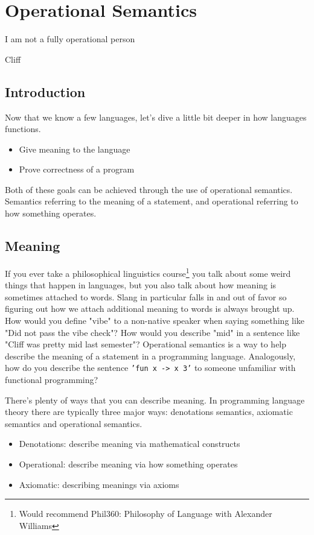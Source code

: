 \documentclass[main.tex]{subfiles}
\begin{document}
\chapter{Operational Semantics}
\epigraph{I am not a fully operational person}{Cliff}

\section{Introduction}
Now that we know a few languages, let's dive a little bit deeper in how languages functions. 
\begin{itemize}
    \item Give meaning to the language
    \item Prove correctness of a program
\end{itemize}
Both of these goals can be achieved through the use of operational semantics. Semantics referring to the meaning of a statement, and operational referring to how something operates. 

\section{Meaning}
If you ever take a philosophical linguistics course\footnote{Would recommend Phil360: Philosophy of Language with Alexander Williams} you talk about some weird things that happen in languages, but you also talk about how meaning is sometimes attached to words. Slang in particular falls in and out of favor so figuring out how we attach additional meaning to words is always brought up. How would you define "vibe" to a non-native speaker when saying something like "Did not pass the vibe check"? How would you describe "mid" in a sentence like "Cliff was pretty mid last semester"? Operational semantics is a way to help describe the meaning of a statement in a programming language. Analogously, how do you describe the sentence \texttt{'fun x -> x 3'} to someone unfamiliar with functional programming? 

There's plenty of ways that you can describe meaning. In programming language theory there are typically three major ways: denotations semantics, axiomatic semantics and operational semantics.
\begin{itemize}
    \item Denotations: describe meaning via mathematical constructs
    \item Operational: describe meaning via how something operates
    \item Axiomatic: describing meanings via axioms
\end{itemize}
\end{document}
